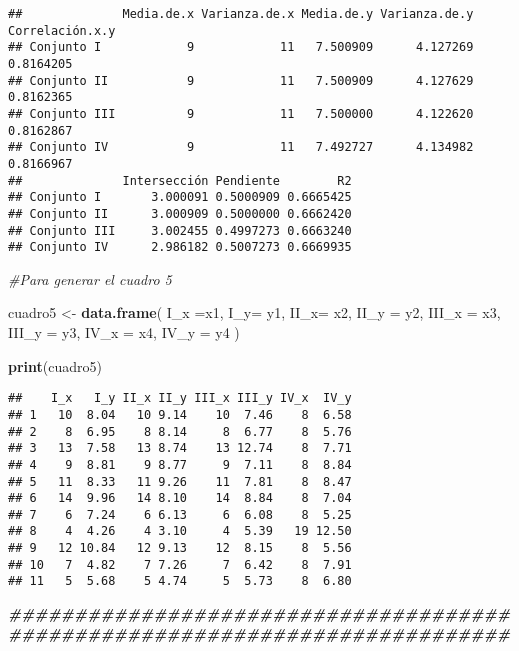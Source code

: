\documentclass[
]{article}
\newenvironment{Shaded}{\begin{snugshade}}{\end{snugshade}}
\newcommand{\AttributeTok}[1]{\textcolor[rgb]{0.13,0.29,0.53}{#1}}
\newcommand{\CommentTok}[1]{\textcolor[rgb]{0.56,0.35,0.01}{\textit{#1}}}
\newcommand{\DocumentationTok}[1]{\textcolor[rgb]{0.56,0.35,0.01}{\textbf{\textit{#1}}}}
\newcommand{\FunctionTok}[1]{\textcolor[rgb]{0.13,0.29,0.53}{\textbf{#1}}}
\newcommand{\NormalTok}[1]{#1}
\newcommand{\OtherTok}[1]{\textcolor[rgb]{0.56,0.35,0.01}{#1}}
\begin{document}
\begin{verbatim}
##              Media.de.x Varianza.de.x Media.de.y Varianza.de.y Correlación.x.y
## Conjunto I            9            11   7.500909      4.127269       0.8164205
## Conjunto II           9            11   7.500909      4.127629       0.8162365
## Conjunto III          9            11   7.500000      4.122620       0.8162867
## Conjunto IV           9            11   7.492727      4.134982       0.8166967
##              Intersección Pendiente        R2
## Conjunto I       3.000091 0.5000909 0.6665425
## Conjunto II      3.000909 0.5000000 0.6662420
## Conjunto III     3.002455 0.4997273 0.6663240
## Conjunto IV      2.986182 0.5007273 0.6669935
\end{verbatim}

\begin{Shaded}
\begin{Highlighting}[]
\CommentTok{\#Para generar el cuadro 5 }

\NormalTok{cuadro5 }\OtherTok{\textless{}{-}} \FunctionTok{data.frame}\NormalTok{(}
  \AttributeTok{I\_x =}\NormalTok{x1, }\AttributeTok{I\_y=}\NormalTok{ y1, }
  \AttributeTok{II\_x=}\NormalTok{ x2, }\AttributeTok{II\_y =}\NormalTok{ y2,}
  \AttributeTok{III\_x =}\NormalTok{ x3, }\AttributeTok{III\_y =}\NormalTok{ y3,}
  \AttributeTok{IV\_x =}\NormalTok{ x4, }\AttributeTok{IV\_y =}\NormalTok{ y4}
\NormalTok{)}

\FunctionTok{print}\NormalTok{(cuadro5)}
\end{Highlighting}
\end{Shaded}

\begin{verbatim}
##    I_x   I_y II_x II_y III_x III_y IV_x  IV_y
## 1   10  8.04   10 9.14    10  7.46    8  6.58
## 2    8  6.95    8 8.14     8  6.77    8  5.76
## 3   13  7.58   13 8.74    13 12.74    8  7.71
## 4    9  8.81    9 8.77     9  7.11    8  8.84
## 5   11  8.33   11 9.26    11  7.81    8  8.47
## 6   14  9.96   14 8.10    14  8.84    8  7.04
## 7    6  7.24    6 6.13     6  6.08    8  5.25
## 8    4  4.26    4 3.10     4  5.39   19 12.50
## 9   12 10.84   12 9.13    12  8.15    8  5.56
## 10   7  4.82    7 7.26     7  6.42    8  7.91
## 11   5  5.68    5 4.74     5  5.73    8  6.80
\end{verbatim}

\begin{Shaded}
\begin{Highlighting}[]
\DocumentationTok{\#\#\#\#\#\#\#\#\#\#\#\#\#\#\#\#\#\#\#\#\#\#\#\#\#\#\#\#\#\#\#\#\#\#\#\#\#\#\#\#\#\#\#\#\#\#\#\#\#\#\#\#\#\#\#\#\#\#\#\#\#\#\#\#\#\#\#\#\#\#\#\#\#\#\#\#}
\end{Highlighting}
\end{Shaded}
\end{document}
